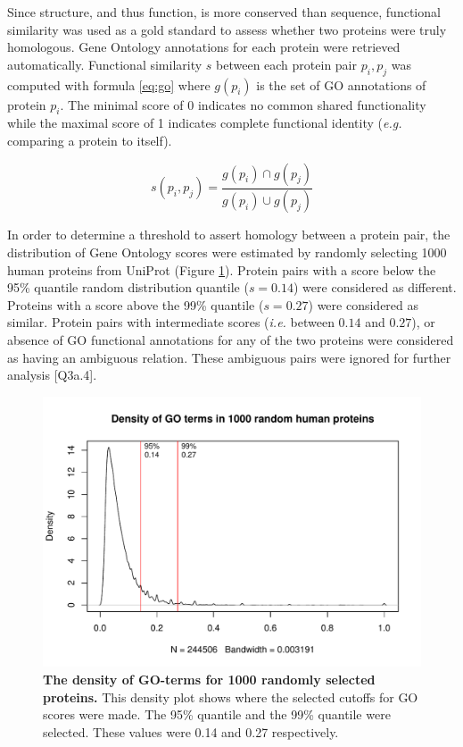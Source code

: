 \documentclass{article}
\begin{document}
Since structure, and thus function, is more conserved than sequence, functional similarity was used as a gold standard to assess whether two proteins were truly homologous. Gene Ontology annotations for each protein were retrieved automatically. Functional similarity $s$ between each protein pair $p_i, p_j$ was computed with formula \eqref{eq:go} where $g(p_i)$ is the set of GO annotations of protein $p_i$. The minimal score of 0 indicates no common shared functionality while the maximal score of 1 indicates complete functional identity (\textit{e.g.} comparing a protein to itself). 

\begin{equation}
s(p_i, p_j) = \frac{g(p_i) \cap g(p_j)}{g(p_i) \cup g(p_j)}
\label{eq:go}
\end{equation}

In order to determine a threshold to assert homology between a protein pair, the distribution of Gene Ontology scores were estimated by randomly selecting 1000 human proteins from UniProt (Figure \ref{fig:go_random_density}). Protein pairs with a score below the 95\% quantile random distribution quantile ($s = 0.14$) were considered as different. Proteins with a score above the 99\% quantile ($s = 0.27$) were considered as similar. Protein pairs with intermediate scores (\textit{i.e.} between $0.14$ and $0.27$), or absence of GO functional annotations for any of the two proteins were considered as having an ambiguous relation. These ambiguous pairs were ignored for further analysis [Q3a.4].

\begin{figure}[!hb]
\includegraphics[width=\linewidth]{go_random_density}
\caption{\textbf{The density of GO-terms for 1000 randomly selected proteins.} This density plot shows where the selected cutoffs for GO scores were made. The 95\% quantile and the 99\% quantile were selected. These values were 0.14 and 0.27 respectively.}
\label{fig:go_random_density}
\end{figure}
\end{document}
